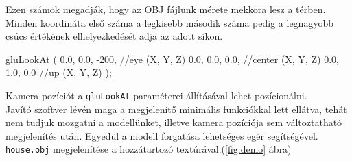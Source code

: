 Ezen számok megadják, hogy az OBJ fájlunk mérete mekkora lesz a térben. Minden koordináta első száma a legkisebb második száma pedig a legnagyobb csúcs értékének elhelyezkedését adja az adott síkon.
\bigskip
\begin{cpp}
gluLookAt
(
        0.0, 0.0, -200, //eye (X, Y, Z)
        0.0, 0.0, 0.0,  //center (X, Y, Z)
        0.0, 1.0, 0.0 //up (X, Y, Z)
);
\end{cpp}
\bigskip

Kamera pozíciót a \texttt{gluLookAt} paraméterei állításával lehet pozícionálni.\\

Javító szoftver lévén maga a megjelenítő minimális funkciókkal lett ellátva, tehát nem tudjuk mozgatni  a modellünket, illetve kamera pozíciója sem változtatható megjelenítés után. Egyedül a modell forgatása lehetséges egér segítségével.\\

\texttt{house.obj} megjelenítése a hozzátartozó textúrával.(\ref{fig:demo} ábra)
\bigskip

